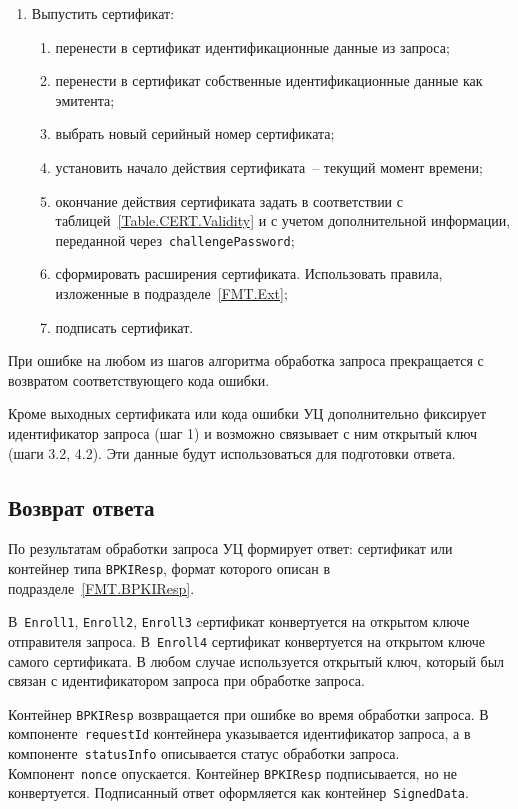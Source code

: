 \begin{enumerate}
\item
Выпустить сертификат:
\begin{enumerate}
\item
перенести в сертификат идентификационные данные из запроса;
\item
перенести в сертификат собственные идентификационные данные как эмитента;
\item
выбрать новый серийный номер сертификата;
\item
установить начало действия сертификата~-- текущий момент времени;
\item
окончание действия сертификата задать в соответствии с 
таблицей~\ref{Table.CERT.Validity} и с учетом дополнительной информации, 
переданной через~\texttt{challengePassword}; 
\item
сформировать расширения сертификата. Использовать правила,
изложенные в подразделе~\ref{FMT.Ext};
\item
подписать сертификат.
\end{enumerate}
\end{enumerate}

При ошибке на любом из шагов алгоритма обработка запроса 
прекращается с возвратом соответствующего кода ошибки.

Кроме выходных сертификата или кода ошибки 
УЦ дополнительно фиксирует идентификатор запроса (шаг 1)
и возможно связывает с ним открытый ключ (шаги 3.2, 4.2). 
Эти данные будут использоваться для подготовки ответа.


\subsection{Возврат ответа}\label{PROCESSES.Enroll.Resp}

По результатам обработки запроса УЦ формирует ответ: сертификат или 
контейнер типа \texttt{BPKIResp}, формат которого описан в 
подразделе~\ref{FMT.BPKIResp}.

В~\texttt{Enroll1}, \texttt{Enroll2}, \texttt{Enroll3}
cертификат конвертуется на открытом ключе отправителя запроса.
В~\texttt{Enroll4} сертификат конвертуется на открытом ключе самого сертификата. 
%
В любом случае используется открытый ключ, который был связан с 
идентификатором запроса при обработке запроса.

Контейнер \texttt{BPKIResp} возвращается при ошибке во время обработки
запроса. В компоненте~\texttt{requestId} контейнера указывается идентификатор 
запроса, а в компоненте~\texttt{statusInfo} описывается статус обработки 
запроса. Компонент~\texttt{nonce} опускается.
%
Контейнер \texttt{BPKIResp} подписывается, но не конвертуется.
%
Подписанный ответ оформляется как контейнер~\texttt{SignedData}.

